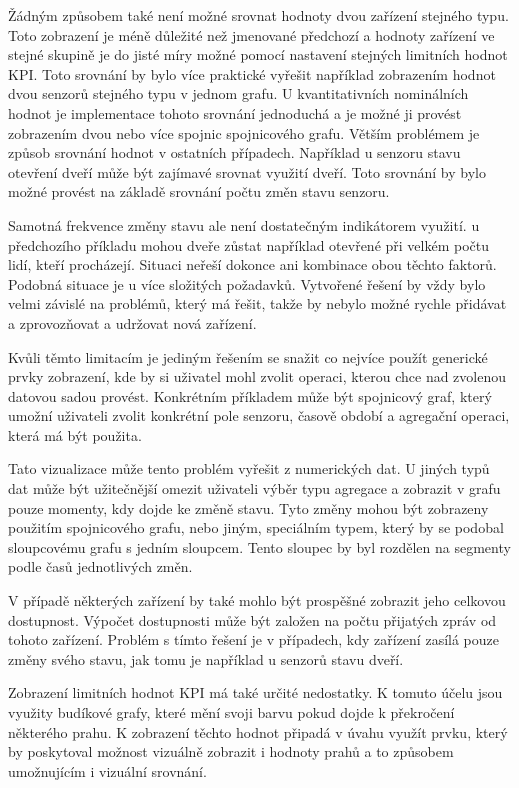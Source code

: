 Žádným způsobem také není možné srovnat hodnoty dvou zařízení stejného typu. Toto zobrazení je méně důležité než jmenované předchozí a hodnoty zařízení ve stejné skupině je do jisté míry možné pomocí nastavení stejných limitních hodnot KPI. Toto srovnání by bylo více praktické vyřešit například zobrazením hodnot dvou senzorů stejného typu v jednom grafu. U kvantitativních nominálních hodnot je implementace tohoto srovnání jednoduchá a je možné ji provést zobrazením dvou nebo více spojnic spojnicového grafu. Větším problémem je způsob srovnání hodnot v ostatních případech. Například u senzoru stavu otevření dveří může být zajímavé srovnat využití dveří. Toto srovnání by bylo možné provést na základě srovnání počtu změn stavu senzoru.

Samotná frekvence změny stavu ale není dostatečným indikátorem využití. u předchozího příkladu mohou dveře zůstat například otevřené při velkém počtu lidí, kteří procházejí. Situaci neřeší dokonce ani kombinace obou těchto faktorů. Podobná situace je u více složitých požadavků. Vytvořené řešení by vždy bylo velmi závislé na problémů, který má řešit, takže by nebylo možné rychle přidávat a zprovozňovat a udržovat nová zařízení. 

Kvůli těmto limitacím je jediným řešením se snažit co nejvíce použít generické prvky zobrazení, kde by si uživatel mohl zvolit operaci, kterou chce nad zvolenou datovou sadou provést. Konkrétním příkladem může být spojnicový graf, který umožní uživateli zvolit konkrétní pole senzoru, časově období a agregační operaci, která má být použita. 

Tato vizualizace může tento problém vyřešit z numerických dat. U jiných typů dat může být užitečnější omezit uživateli výběr typu agregace a zobrazit v grafu pouze momenty, kdy dojde ke změně stavu. Tyto změny mohou být zobrazeny použitím spojnicového grafu, nebo jiným, speciálním typem, který by se podobal sloupcovému grafu s jedním sloupcem. Tento sloupec by byl rozdělen na segmenty podle časů jednotlivých změn.

V případě některých zařízení by také mohlo být prospěšné zobrazit jeho celkovou dostupnost. Výpočet dostupnosti může být založen na počtu přijatých zpráv od tohoto zařízení. Problém s tímto řešení je v případech, kdy zařízení zasílá pouze změny svého stavu, jak tomu je například u senzorů stavu dveří.

Zobrazení limitních hodnot KPI má také určité nedostatky. K tomuto účelu jsou využity budíkové grafy, které mění svoji barvu pokud dojde k překročení některého prahu. K zobrazení těchto hodnot připadá v úvahu využít prvku, který by poskytoval možnost vizuálně zobrazit i hodnoty prahů a to způsobem umožnujícím i vizuální srovnání.

